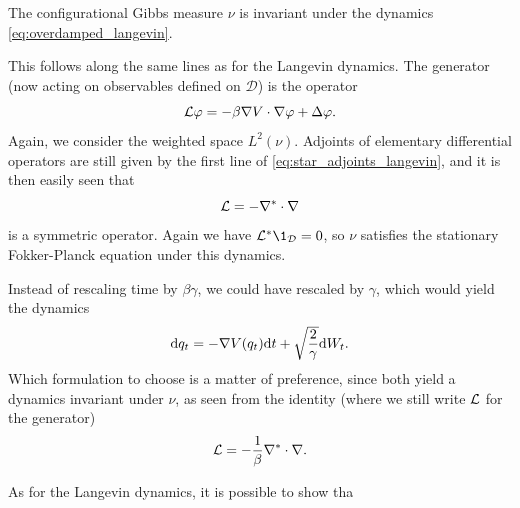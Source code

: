    \begin{prop}
        The configurational Gibbs measure $\nu$ is invariant under the dynamics \eqref{eq:overdamped_langevin}.
    \end{prop}

    This follows along the same lines as for the Langevin dynamics. The generator (now acting on observables defined on $\mathcal D$) is the operator
    \begin{equation}
        \label{eq:overdamped_langevin_generator}
        \mathcal{L}\varphi=-\beta\nabla V\cdot \nabla\varphi + \Delta \varphi.
    \end{equation}
    Again, we consider the weighted space $L^2(\nu)$. Adjoints of elementary differential operators are still given by the first line of \eqref{eq:star_adjoints_langevin}, and it is then easily seen that
    \begin{equation}
        \label{eq:L_overdamped_symmetric}
        \mathcal{L}=-\nabla^*\cdot\nabla
    \end{equation}
    is a symmetric operator. Again we have $\cL^*\1_{\mathcal D}=0$, so $\nu$ satisfies the stationary Fokker-Planck equation under this dynamics.

    \begin{remark}
        Instead of rescaling time by $\beta\gamma$, we could have rescaled by $\gamma$, which would yield the dynamics
        \begin{equation}
            \label{eq:overdamped_langevin_alt}
            \mathrm{d} q_t=-\nabla V(q_t)\mathrm{d} t+\sqrt{\frac 2\gamma}\mathrm{d} W_t.
        \end{equation}
        Which formulation to choose is a matter of preference, since both yield a dynamics invariant under $\nu$, as seen from the identity (where we still write $\mathcal{L}$ for the generator)
        \[\mathcal{L}=-\frac1\beta\nabla^*\cdot\nabla.\]
    \end{remark}

    As for the Langevin dynamics, it is possible to show tha


